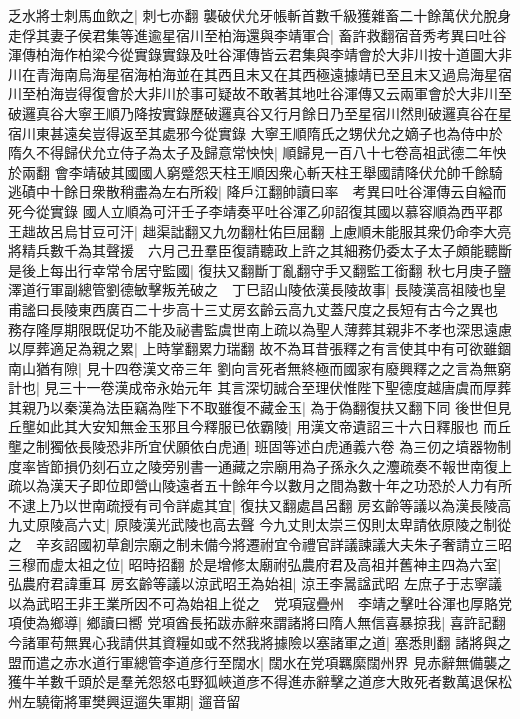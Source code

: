 乏水將士刺馬血飲之|{
	刺七亦翻}
襲破伏允牙帳斬首數千級獲雜畜二十餘萬伏允脫身走俘其妻子侯君集等進逾星宿川至柏海還與李靖軍合|{
	畜許救翻宿音秀考異曰吐谷渾傳柏海作柏梁今從實錄實錄及吐谷渾傳皆云君集與李靖會於大非川按十道圖大非川在青海南烏海星宿海柏海並在其西且末又在其西極遠據靖已至且末又過烏海星宿川至柏海豈得復會於大非川於事可疑故不敢著其地吐谷渾傳又云兩軍會於大非川至破邏真谷大寧王順乃降按實錄歷破邏真谷又行月餘日乃至星宿川然則破邏真谷在星宿川東甚遠矣豈得返至其處邪今從實錄}
大寧王順隋氏之甥伏允之嫡子也為侍中於隋久不得歸伏允立侍子為太子及歸意常怏怏|{
	順歸見一百八十七卷高祖武德二年怏於兩翻}
會李靖破其國國人窮蹙怨天柱王順因衆心斬天柱王舉國請降伏允帥千餘騎逃磧中十餘日衆散稍盡為左右所殺|{
	降戶江翻帥讀曰率　考異曰吐谷渾傳云自縊而死今從實錄}
國人立順為可汗壬子李靖奏平吐谷渾乙卯詔復其國以慕容順為西平郡王趉故呂烏甘豆可汗|{
	趉渠詘翻又九勿翻杜佑巨屈翻}
上慮順未能服其衆仍命李大亮將精兵數千為其聲援　六月己丑羣臣復請聽政上許之其細務仍委太子太子頗能聽斷是後上每出行幸常令居守監國|{
	復扶又翻斷丁亂翻守手又翻監工銜翻}
秋七月庚子鹽澤道行軍副總管劉德敏擊叛羌破之　丁巳詔山陵依漢長陵故事|{
	長陵漢高祖陵也皇甫謐曰長陵東西廣百二十步高十三丈房玄齡云高九丈蓋尺度之長短有古今之異也}
務存隆厚期限既促功不能及祕書監虞世南上疏以為聖人薄葬其親非不孝也深思遠慮以厚葬適足為親之累|{
	上時掌翻累力瑞翻}
故不為耳昔張釋之有言使其中有可欲雖錮南山猶有隙|{
	見十四卷漢文帝三年}
劉向言死者無終極而國家有廢興釋之之言為無窮計也|{
	見三十一卷漢成帝永始元年}
其言深切誠合至理伏惟陛下聖德度越唐虞而厚葬其親乃以秦漢為法臣竊為陛下不取雖復不藏金玉|{
	為于偽翻復扶又翻下同}
後世但見丘壟如此其大安知無金玉邪且今釋服已依霸陵|{
	用漢文帝遺詔三十六日釋服也}
而丘壟之制獨依長陵恐非所宜伏願依白虎通|{
	班固等述白虎通義六卷}
為三仞之墳器物制度率皆節損仍刻石立之陵旁别書一通藏之宗廟用為子孫永久之灋疏奏不報世南復上疏以為漢天子即位即營山陵遠者五十餘年今以數月之間為數十年之功恐於人力有所不逮上乃以世南疏授有司令詳處其宜|{
	復扶又翻處昌呂翻}
房玄齡等議以為漢長陵高九丈原陵高六丈|{
	原陵漢光武陵也高去聲}
今九丈則太崇三仭則太卑請依原陵之制從之　辛亥詔國初草創宗廟之制未備今將遷祔宜令禮官詳議諫議大夫朱子奢請立三昭三穆而虚太祖之位|{
	昭時招翻}
於是增修太廟祔弘農府君及高祖并舊神主四為六室|{
	弘農府君諱重耳}
房玄齡等議以涼武昭王為始祖|{
	涼王李暠諡武昭}
左庶子于志寧議以為武昭王非王業所因不可為始祖上從之　党項寇疊州　李靖之擊吐谷渾也厚賂党項使為鄉導|{
	鄉讀曰嚮}
党項酋長拓跋赤辭來謂諸將曰隋人無信喜暴掠我|{
	喜許記翻}
今諸軍苟無異心我請供其資糧如或不然我將據險以塞諸軍之道|{
	塞悉則翻}
諸將與之盟而遣之赤水道行軍總管李道彦行至闊水|{
	闊水在党項羈縻闊州界}
見赤辭無備襲之獲牛羊數千頭於是羣羌怨怒屯野狐峽道彦不得進赤辭擊之道彦大敗死者數萬退保松州左驍衛將軍樊興逗遛失軍期|{
	遛音留}
